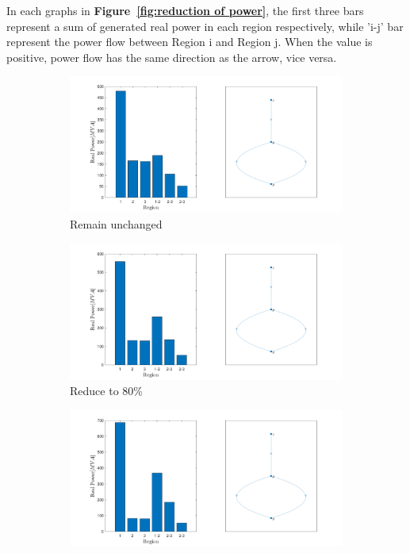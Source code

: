 \documentclass{article}
\begin{document}
In each graphs in \textbf{Figure~\ref{fig:reduction of power}}, the first three bars represent a sum of generated real power in each region respectively, while 'i-j' bar represent the power flow between Region i and Region j. When the value is positive, power flow has the same direction as the arrow, vice versa.\\

\begin{figure}[hbt!]
\begin{subfigure}{.5\textwidth}
  \centering
  \includegraphics[width=0.9\linewidth]{Simulation_Results/unchanged.pdf}
  \caption{Remain unchanged}
  \label{fig:sfig1}
\end{subfigure}%
\begin{subfigure}{.5\textwidth}
  \centering
  \includegraphics[width=0.9\linewidth]{Simulation_Results/reduce_to_80.pdf}
  \caption{Reduce to 80\%}
  \label{fig:sfig2}
\end{subfigure}
\begin{subfigure}{.5\textwidth}
  \centering
  \includegraphics[width=0.9\linewidth]{Simulation_Results/reduce_to_50.pdf}

\end{subfigure}
\end{figure}
\end{document}
